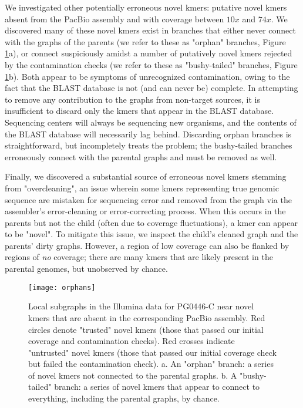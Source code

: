 We investigated other potentially erroneous novel kmers: putative novel kmers absent from the PacBio assembly and with coverage between $10x$ and $74x$.  We discovered many of these novel kmers exist in branches that either never connect with the graphs of the parents (we refer to these as "orphan" branches, Figure \ref{fig:orphans}a), or connect suspiciously amidst a number of putatively novel kmers rejected by the contamination checks (we refer to these as "bushy-tailed" branches, Figure \ref{fig:orphans}b).  Both appear to be symptoms of unrecognized contamination, owing to the fact that the BLAST database is not (and can never be) complete.  In attempting to remove any contribution to the graphs from non-target sources, it is insufficient to discard only the kmers that appear in the BLAST database.  Sequencing centers will always be sequencing new organisms, and the contents of the BLAST database will necessarily lag behind.  Discarding orphan branches is straightforward, but incompletely treats the problem; the bushy-tailed branches erroneously connect with the parental graphs and must be removed as well.

Finally, we discovered a substantial source of erroneous novel kmers stemming from "overcleaning", an issue wherein some kmers representing true genomic sequence are mistaken for sequencing error and removed from the graph via the assembler's error-cleaning or error-correcting process.  When this occurs in the parents but not the child (often due to coverage fluctuations), a kmer can appear to be "novel".  To mitigate this issue, we inspect the child's cleaned graph and the parents' dirty graphs.  However, a region of low coverage can also be flanked by regions of \textit{no} coverage; there are many kmers that are likely present in the parental genomes, but unobserved by chance.

\begin{figure}[h!]
  \centering
    \texttt{[image: orphans]}
  \caption{Local subgraphs in the Illumina data for PG0446-C near novel kmers that are absent in the corresponding PacBio assembly.  Red circles denote "trusted" novel kmers (those that passed our initial coverage and contamination checks).  Red crosses indicate "untrusted" novel kmers (those that passed our initial coverage check but failed the contamination check).  a. An "orphan" branch: a series of novel kmers not connected to the parental graphs.  b. A "bushy-tailed" branch: a series of novel kmers that appear to connect to everything, including the parental graphs, by chance.}
  \label{fig:orphans}
\end{figure}

